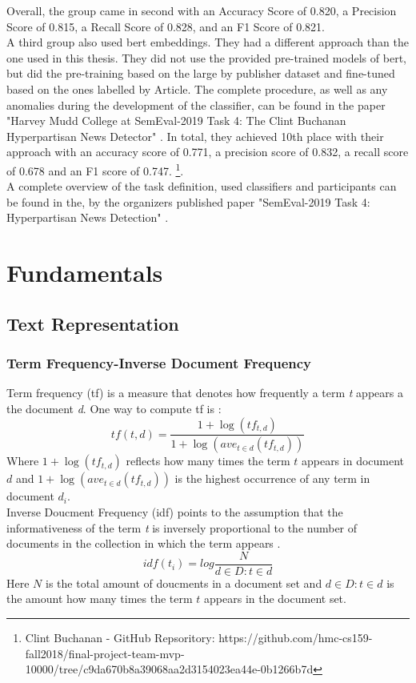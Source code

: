 \documentclass[a4paper, 11pt,titlepage,oneside,openany]{book}
\begin{document}
\newpage 
\noindent Overall, the group came in second with an Accuracy Score of 0.820, a Precision Score of 0.815, a Recall Score of 0.828, and an F1 Score of 0.821. \\
\indent A third group also used \gls{bert} embeddings. They had a different approach than the one used in this thesis. They did not use the provided pre-trained models of \gls{bert}, but did the pre-training based on the large by publisher dataset and fine-tuned based on the ones labelled by Article. The complete procedure, as well as any anomalies during the development of the classifier, can be found in the paper "Harvey Mudd College at SemEval-2019 Task 4: The Clint Buchanan Hyperpartisan News Detector" \cite{bertgruppe}. In total, they achieved 10th place with their approach with an accuracy score of 0.771, a precision score of 0.832, a recall score of 0.678 and an F1 score of 0.747. \footnote{Clint Buchanan - GitHub Repsoritory: https://github.com/hmc-cs159-fall2018/final-project-team-mvp-10000/tree/c9da670b8a39068aa2d3154023ea44e-0b1266b7d}. \\
\indent A complete overview of the task definition, used classifiers and participants can be found in the, by the organizers published paper "SemEval-2019 Task 4: Hyperpartisan News Detection" \cite{hyperpartisannewsdetection}.


\chapter{Fundamentals}
\section{Text Representation}
\subsection{Term Frequency-Inverse Document Frequency}
\indent Term frequency (\gls{tf}) is a measure that denotes how frequently a term \textit{t} appears a the document \textit{d}. One way to compute \gls{tf} is \cite{IR-book}:\\
\[
tf(t,d)=\frac{1+\log(tf_{t,d})}{1+\log(ave_{t\in d}(tf_{t,d}))}
\]
Where $1+\log(tf_{t,d})$ reflects how many times the term $t$ appears in document $d$ and $1+\log(ave_{t\in d}(tf_{t,d}))$ is the highest occurrence of any term in document $d_i$.\\

\indent Inverse Doucment Frequency (\gls{idf}) points to the assumption that the informativeness of the term \textit{t} is inversely proportional to the number of documents in the collection in which the term appears \cite{IR-book}.\\
\[
idf(t_i)=log\frac{N}{d \in D : t \in d}
\]
Here $N$ is the total amount of doucments in a document set and $d \in D : t \in d$ is the amount how many times the term $t$ appears in the document set.\\
\end{document}
